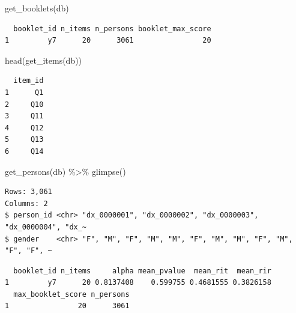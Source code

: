 \documentclass[
  letterpaper,
  DIV=11,
  numbers=noendperiod]{scrreprt}
\newenvironment{Shaded}{\begin{snugshade}}{\end{snugshade}}
\newcommand{\FunctionTok}[1]{\textcolor[rgb]{0.28,0.35,0.67}{#1}}
\newcommand{\NormalTok}[1]{\textcolor[rgb]{0.00,0.23,0.31}{#1}}
\newcommand{\OtherTok}[1]{\textcolor[rgb]{0.00,0.23,0.31}{#1}}
\newcommand{\SpecialCharTok}[1]{\textcolor[rgb]{0.37,0.37,0.37}{#1}}
\begin{document}
\begin{Shaded}
\begin{Highlighting}[]
\FunctionTok{get\_booklets}\NormalTok{(db)}
\end{Highlighting}
\end{Shaded}

\begin{verbatim}
  booklet_id n_items n_persons booklet_max_score
1         y7      20      3061                20
\end{verbatim}

\begin{Shaded}
\begin{Highlighting}[]
\FunctionTok{head}\NormalTok{(}\FunctionTok{get\_items}\NormalTok{(db))}
\end{Highlighting}
\end{Shaded}

\begin{verbatim}
  item_id
1      Q1
2     Q10
3     Q11
4     Q12
5     Q13
6     Q14
\end{verbatim}

\begin{Shaded}
\begin{Highlighting}[]
\FunctionTok{get\_persons}\NormalTok{(db) }\SpecialCharTok{\%\textgreater{}\%} 
  \FunctionTok{glimpse}\NormalTok{()}
\end{Highlighting}
\end{Shaded}

\begin{verbatim}
Rows: 3,061
Columns: 2
$ person_id <chr> "dx_0000001", "dx_0000002", "dx_0000003", "dx_0000004", "dx_~
$ gender    <chr> "F", "M", "F", "M", "M", "F", "M", "M", "F", "M", "F", "F", ~
\end{verbatim}

\begin{Shaded}
\end{Shaded}

\begin{verbatim}
  booklet_id n_items     alpha mean_pvalue  mean_rit  mean_rir
1         y7      20 0.8137408    0.599755 0.4681555 0.3826158
  max_booklet_score n_persons
1                20      3061
\end{verbatim}

\begin{Shaded}
\end{Shaded}
\end{document}
